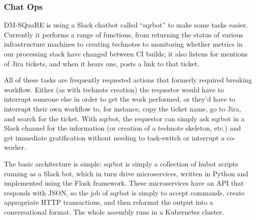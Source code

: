 \subsubsection{Chat Ops}

DM-SQuaRE is using a Slack chatbot called ``sqrbot'' to make some tasks
easier. Currently it performs a range of functions, from returning the
status of various infrastructure machines to creating technotes to
monitoring whether metrics in our processing stack have changed between
CI builds; it also listens for mentions of Jira tickets, and when it
hears one, posts a link to that ticket.

All of these tasks are frequently requested actions that formerly
required breaking workflow.  Either (as with technote creation) the
requestor would have to interrupt someone else in order to get the work
performed, or they'd have to interrupt their own workflow to, for
instance, copy the ticket name, go to Jira, and search for the ticket.
With sqrbot, the requestor can simply ask sqrbot in a Slack channel for
the information (or creation of a technote skeleton, etc.) and get
immediate gratification without needing to task-switch or interrupt
a co-worker.

The basic architecture is simple: sqrbot is simply a collection of hubot
scripts running as a Slack bot, which in turn drive microservices,
written in Python and implemented using the Flask framework.  These
microservices have an API that responds with JSON, so the job of sqrbot
is simply to accept commands, create appropriate HTTP transactions, and
then reformat the output into a conversational format.  The whole
assembly runs in a Kubernetes cluster.
